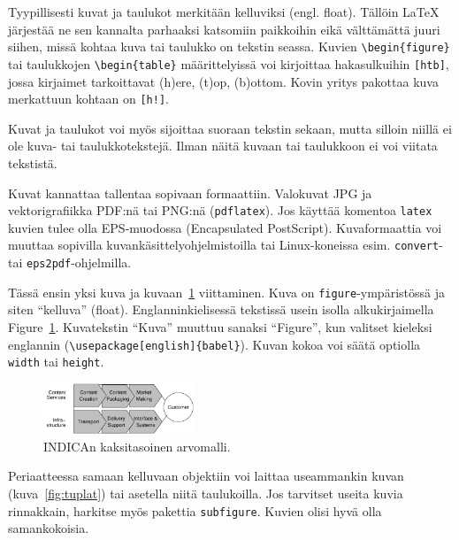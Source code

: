 Tyypillisesti kuvat ja taulukot merkitään kelluviksi
(engl. float). Tällöin \LaTeX{} järjestää ne sen kannalta parhaaksi
katsomiin paikkoihin eikä välttämättä juuri siihen, missä kohtaa kuva
tai taulukko on tekstin seassa. Kuvien \verb!\begin{figure}! tai
taulukkojen \verb!\begin{table}! määrittelyissä voi kirjoittaa
hakasulkuihin \verb![htb]!, jossa kirjaimet tarkoittavat (h)ere,
(t)op, (b)ottom.  Kovin yritys pakottaa kuva merkattuun kohtaan on
\verb-[h!]-.

Kuvat ja taulukot voi myös sijoittaa suoraan tekstin sekaan, mutta 
silloin niillä ei ole kuva- tai taulukkotekstejä. Ilman näitä
kuvaan tai taulukkoon ei voi viitata tekstistä.

Kuvat kannattaa tallentaa sopivaan formaattiin. Valokuvat JPG
ja vektorigrafiikka PDF:nä tai PNG:nä (\verb!pdflatex!).
Jos käyttää komentoa \verb!latex! kuvien tulee olla EPS-muodossa 
(Encapsulated PostScript). Kuvaformaattia voi muuttaa sopivilla
kuvankäsittelyohjelmistoilla tai Linux-koneissa esim. 
 \verb!convert!- tai \verb!eps2pdf!-ohjelmilla.

Tässä ensin yksi kuva ja kuvaan~\ref{fig:indica_model} viittaminen.
Kuva on \verb!figure!-ympäristössä ja siten ``kelluva'' (float).
Englanninkielisessä tekstissä usein isolla alkukirjaimella
Figure~\ref{fig:indica_model}. Kuvatekstin ``Kuva'' muuttuu
sanaksi ``Figure'', kun valitset kieleksi englannin 
(\verb!\usepackage[english]{babel}!). Kuvan kokoa voi säätä
optiolla \verb!width! tai \verb!height!.

\begin{figure}[htb]
  \begin{center}
    \includegraphics[width=0.4\textwidth]{indica_model}
    \caption{INDICAn kaksitasoinen arvomalli.}
    \label{fig:indica_model}
  \end{center}
\end{figure}

Periaatteessa samaan kelluvaan objektiin voi laittaa useammankin kuvan
(kuva~\ref{fig:tuplat}) tai asetella niitä taulukoilla.
Jos tarvitset useita kuvia rinnakkain, harkitse
myös pakettia \verb!subfigure!. Kuvien olisi hyvä olla samankokoisia.

